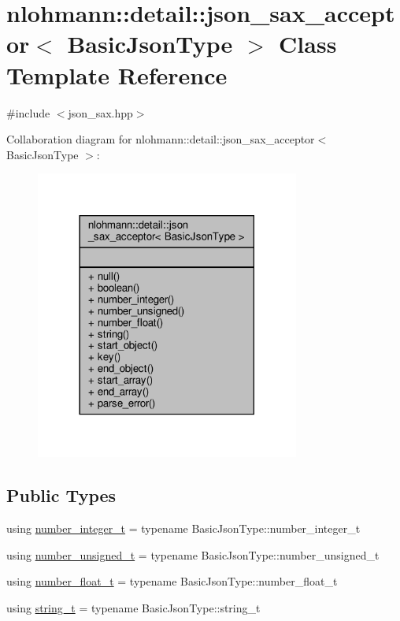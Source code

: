 \hypertarget{classnlohmann_1_1detail_1_1json__sax__acceptor}{}\section{nlohmann\+:\+:detail\+:\+:json\+\_\+sax\+\_\+acceptor$<$ Basic\+Json\+Type $>$ Class Template Reference}
\label{classnlohmann_1_1detail_1_1json__sax__acceptor}


{\ttfamily \#include $<$json\+\_\+sax.\+hpp$>$}



Collaboration diagram for nlohmann\+:\+:detail\+:\+:json\+\_\+sax\+\_\+acceptor$<$ Basic\+Json\+Type $>$\+:\nopagebreak
\begin{figure}[H]
\begin{center}
\leavevmode
\includegraphics[width=246pt]{classnlohmann_1_1detail_1_1json__sax__acceptor__coll__graph}
\end{center}
\end{figure}
\subsection*{Public Types}
\begin{DoxyCompactItemize}
\item 
using \hyperlink{classnlohmann_1_1detail_1_1json__sax__acceptor_a41876b17c0e8bdb55580eaf5e4e2ded8}{number\+\_\+integer\+\_\+t} = typename Basic\+Json\+Type\+::number\+\_\+integer\+\_\+t
\item 
using \hyperlink{classnlohmann_1_1detail_1_1json__sax__acceptor_ae07454608ea6f3cfb765f95e3c850043}{number\+\_\+unsigned\+\_\+t} = typename Basic\+Json\+Type\+::number\+\_\+unsigned\+\_\+t
\item 
using \hyperlink{classnlohmann_1_1detail_1_1json__sax__acceptor_a5502f483fc60a1bcd73e0e46b6ab36e4}{number\+\_\+float\+\_\+t} = typename Basic\+Json\+Type\+::number\+\_\+float\+\_\+t
\item 
using \hyperlink{classnlohmann_1_1detail_1_1json__sax__acceptor_a3a8078bbf865ec355106f6048241609a}{string\+\_\+t} = typename Basic\+Json\+Type\+::string\+\_\+t
\end{DoxyCompactItemize}
